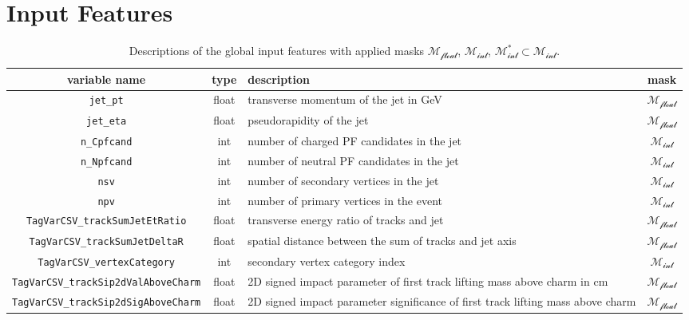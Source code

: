 \section{Input Features}

\begin{table}[h]
\centering
\caption{Descriptions of the global input features with applied masks $\mathcal{M_{\text{float}}}$, $\mathcal{M_{\text{int}}}$, $\mathcal{M_{\text{int}}^*\subset M_{\text{int}}}$.}
\begin{tabularx}{\textwidth}{|c|c|X|c|}
\hline
\textbf{variable name} & \textbf{type} & \textbf{description} & \textbf{mask} \\
\hline
\texttt{jet\_pt} & float & transverse momentum of the jet in GeV & \cellcolor{green!50}$\mathcal{M_{\text{float}}}$ \\
\hline
\texttt{jet\_eta} & float & pseudorapidity of the jet & \cellcolor{green!50}$\mathcal{M_{\text{float}}}$ \\
\hline
\texttt{n\_Cpfcand} & int & number of charged PF candidates in the jet & \cellcolor{orange!50}$\mathcal{M_{\text{int}}}$ \\
\hline
\texttt{n\_Npfcand} & int & number of neutral PF candidates in the jet & \cellcolor{orange!50}$\mathcal{M_{\text{int}}}$ \\
\hline
\texttt{nsv} & int & number of secondary vertices in the jet & \cellcolor{orange!50}$\mathcal{M_{\text{int}}}$ \\
\hline
\texttt{npv} & int & number of primary vertices in the event & \cellcolor{orange!50}$\mathcal{M_{\text{int}}}$ \\
\hline
\texttt{TagVarCSV\_trackSumJetEtRatio} & float & transverse energy ratio of tracks and jet & \cellcolor{green!50}$\mathcal{M_{\text{float}}}$ \\
\hline
\texttt{TagVarCSV\_trackSumJetDeltaR} & float & spatial distance between the sum of tracks and jet axis & \cellcolor{green!50}$\mathcal{M_{\text{float}}}$ \\
\hline
\texttt{TagVarCSV\_vertexCategory} & int & secondary vertex category index & \cellcolor{orange!50}$\mathcal{M_{\text{int}}}$ \\
\hline
\texttt{TagVarCSV\_trackSip2dValAboveCharm} & float & 2D signed impact parameter of first track lifting mass above charm in cm & \cellcolor{green!50}$\mathcal{M_{\text{float}}}$ \\
\hline
\texttt{TagVarCSV\_trackSip2dSigAboveCharm} & float & 2D signed impact parameter significance of first track lifting mass above charm & \cellcolor{green!50}$\mathcal{M_{\text{float}}}$ \\

\end{tabularx}
\end{table}
